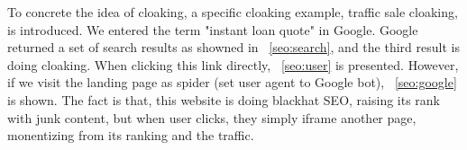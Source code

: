 To concrete the idea of cloaking, a specific cloaking example, traffic sale 
cloaking, is introduced. We entered the term "instant loan quote"
in Google. Google returned a set of search results as showned in
~\autoref{seo:search}, and the third result is doing cloaking. 
When clicking this link directly, ~\autoref{seo:user} is presented. However, if
we visit the landing page as spider (set user agent to Google bot),
~\autoref{seo:google} is shown.
The fact is that, this website is doing blackhat SEO,
raising its rank with junk content, but when user clicks, they simply iframe
another page, monentizing from its ranking and the traffic.

%
%
%


